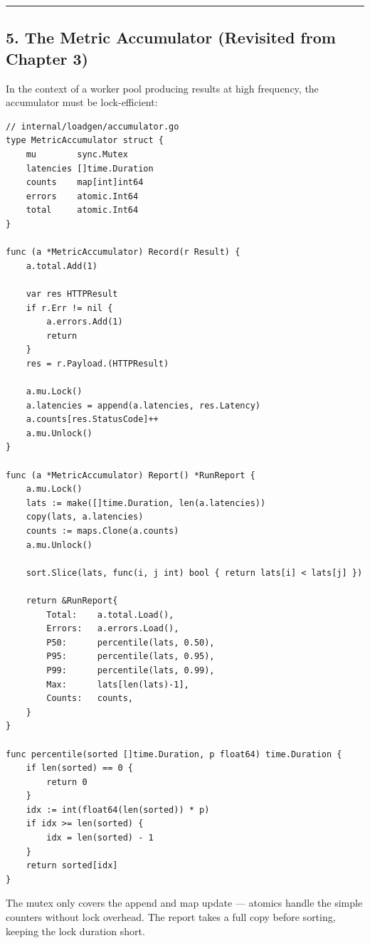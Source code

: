 \documentclass[11pt,a4paper,oneside]{book}
\begin{document}
\begin{center}\rule{0.5\linewidth}{0.5pt}\end{center}

\subsection{5. The Metric Accumulator (Revisited from Chapter
3)}

In the context of a worker pool producing results at high frequency, the
accumulator must be lock-efficient:

\begin{verbatim}
// internal/loadgen/accumulator.go
type MetricAccumulator struct {
    mu        sync.Mutex
    latencies []time.Duration
    counts    map[int]int64
    errors    atomic.Int64
    total     atomic.Int64
}

func (a *MetricAccumulator) Record(r Result) {
    a.total.Add(1)

    var res HTTPResult
    if r.Err != nil {
        a.errors.Add(1)
        return
    }
    res = r.Payload.(HTTPResult)

    a.mu.Lock()
    a.latencies = append(a.latencies, res.Latency)
    a.counts[res.StatusCode]++
    a.mu.Unlock()
}

func (a *MetricAccumulator) Report() *RunReport {
    a.mu.Lock()
    lats := make([]time.Duration, len(a.latencies))
    copy(lats, a.latencies)
    counts := maps.Clone(a.counts)
    a.mu.Unlock()

    sort.Slice(lats, func(i, j int) bool { return lats[i] < lats[j] })

    return &RunReport{
        Total:    a.total.Load(),
        Errors:   a.errors.Load(),
        P50:      percentile(lats, 0.50),
        P95:      percentile(lats, 0.95),
        P99:      percentile(lats, 0.99),
        Max:      lats[len(lats)-1],
        Counts:   counts,
    }
}

func percentile(sorted []time.Duration, p float64) time.Duration {
    if len(sorted) == 0 {
        return 0
    }
    idx := int(float64(len(sorted)) * p)
    if idx >= len(sorted) {
        idx = len(sorted) - 1
    }
    return sorted[idx]
}
\end{verbatim}

The mutex only covers the append and map update --- atomics handle the
simple counters without lock overhead. The report takes a full copy
before sorting, keeping the lock duration short.
\end{document}
